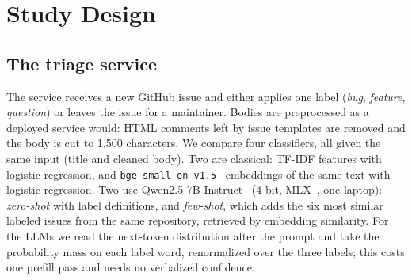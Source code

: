 \section{Study Design}\label{sec:design}

\subsection{The triage service}
The service receives a new GitHub issue and either applies one label (\emph{bug}, \emph{feature},
\emph{question}) or leaves the issue for a maintainer. Bodies are preprocessed as a deployed service
would: HTML comments left by issue templates are removed and the body is cut to 1{,}500 characters.
We compare four classifiers, all given the same input (title and cleaned body). Two are classical:
TF-IDF features with logistic regression, and \texttt{bge-small-en-v1.5}~\cite{xiao2023cpack}
embeddings of the same text with logistic regression. Two use
Qwen2.5-7B-Instruct~\cite{qwen2025qwen25} (4-bit, MLX~\cite{mlx2023}, one laptop): \emph{zero-shot}
with label definitions, and \emph{few-shot}, which adds the six most similar labeled issues from the
same repository, retrieved by embedding similarity. For the LLMs we read the next-token distribution
after the prompt and take the probability mass on each label word, renormalized over the three
labels; this costs one prefill pass and needs no verbalized confidence.


